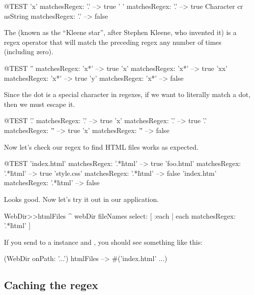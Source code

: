 \documentclass[a4paper,10pt,twoside]{book}
\begin{document}
\begin{code}{@TEST}
'x' matchesRegex: '.' --> true
' ' matchesRegex: '.'  --> true
Character cr asString matchesRegex: '.' --> false
\end{code}

The \ct{*} (known as the ``Kleene star'', after Stephen Kleene, who invented it) is a regex operator that will match the preceding regex any number of times (including zero).

\begin{code}{@TEST}
'' matchesRegex: 'x*'     --> true
'x' matchesRegex: 'x*'   --> true
'xx' matchesRegex: 'x*' --> true
'y' matchesRegex: 'x*'   --> false
\end{code}

Since the dot is a special character in regexes, if we want to literally match a dot, then we must escape it.

\begin{code}{@TEST}
'.' matchesRegex: '.'   --> true
'x' matchesRegex: '.'  --> true
'.' matchesRegex: '\.'  --> true
'x' matchesRegex: '\.' --> false
\end{code}

Now let's check our regex to find HTML files works as expected.

\begin{code}{@TEST}
'index.html' matchesRegex: '.*\.html' --> true
'foo.html' matchesRegex: '.*\.html'    --> true
'style.css' matchesRegex: '.*\.html'   --> false
'index.htm' matchesRegex: '.*\.html' --> false
\end{code}

Looks good. Now let's try it out in our application.


\begin{code}{}
WebDir>>htmlFiles
	^ webDir fileNames select: [ :each | each matchesRegex: '.*\.html' ]
\end{code}

If you send  to a  instance and , you should see something like this:

\begin{code}{}
(WebDir onPath: '...') htmlFiles --> #('index.html' ...)
\end{code}

\subsection{Caching the regex}
\end{document}
